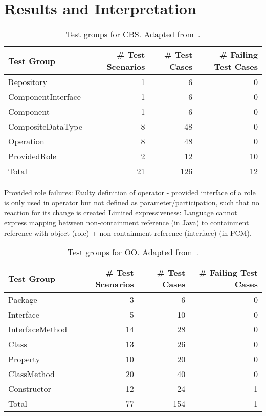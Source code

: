 \section{Results and Interpretation}

\begin{table}[htb]
	\centering
		\begin{tabular}{lrrr}
			\toprule
			\multicolumn{1}{l}{\bfseries Test Group} & \multicolumn{1}{r}{\bfseries \# Test Scenarios} & \multicolumn{1}{r}{\bfseries \# Test Cases} & \multicolumn{1}{r}{\bfseries \# Failing Test Cases} \\
			\midrule
			Repository 				& 1	& 6		& 0		 \\
			ComponentInterface 		& 1 & 6		& 0		 \\
			Component 				& 1	& 6		& 0		 \\
			CompositeDataType 		& 8	& 48	& 0		 \\
			Operation 				& 8	& 48	& 0		 \\
			ProvidedRole 			& 2	& 12	& 10		 \\
			\midrule
			Total 					& 21& 126	& 12		 \\
			\bottomrule
		\end{tabular}
	\caption{Test groups for CBS. Adapted from~\cite[Table 10.1]{hennig2020ma}.}
	\label{tab:commonalities_evaluation:tests_cbs}
\end{table}

Provided role failures: Faulty definition of operator - provided interface of a role is only used in operator but not defined as parameter/participation, such that no reaction for its change is created
Limited expressiveness: Language cannot express mapping between non-containment reference (in Java) to containment reference with object (role) + non-containment reference (interface) (in PCM).

\begin{table}[htb]
	\centering
		\begin{tabular}{lrrr}
			\toprule
			\multicolumn{1}{l}{\bfseries Test Group} & \multicolumn{1}{r}{\bfseries \# Test Scenarios} & \multicolumn{1}{r}{\bfseries \# Test Cases} & \multicolumn{1}{r}{\bfseries \# Failing Test Cases} \\
			\midrule
			Package 			& 3		& 6		& 0		 \\
			Interface 			& 5 	& 10	& 0		 \\
			InterfaceMethod 	& 14	& 28	& 0		 \\
			Class 				& 13	& 26	& 0		 \\
			Property 			& 10	& 20	& 0		 \\
			ClassMethod 		& 20	& 40	& 0		 \\
			Constructor 		& 12	& 24	& 1		 \\
			\midrule
			Total 				& 77	& 154	& 1		 \\
			\bottomrule
		\end{tabular}
	\caption{Test groups for OO. Adapted from~\cite[Table 10.2]{hennig2020ma}.}
	\label{tab:commonalities_evaluation:tests_oo}
\end{table}

